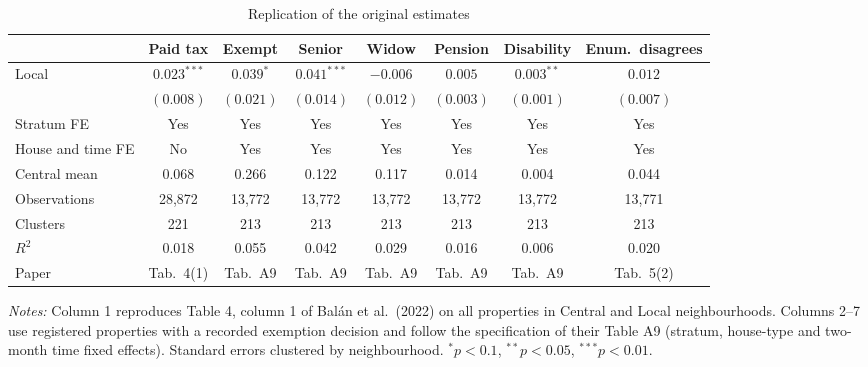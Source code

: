 \begin{table}[!htbp]\centering\footnotesize
\caption{Replication of the original estimates}\label{tab:replication}
\begin{threeparttable}
\begin{tabular}{lccccccc}
\toprule
 & Paid tax & Exempt & Senior & Widow & Pension & Disability & Enum.\ disagrees \\
\midrule
Local & $0.023^{***}$ & $0.039^{*}$ & $0.041^{***}$ & $-0.006$ & $0.005$ & $0.003^{**}$ & $0.012$ \\
 & $(0.008)$ & $(0.021)$ & $(0.014)$ & $(0.012)$ & $(0.003)$ & $(0.001)$ & $(0.007)$ \\
\midrule
Stratum FE & Yes & Yes & Yes & Yes & Yes & Yes & Yes \\
House and time FE & No & Yes & Yes & Yes & Yes & Yes & Yes \\
Central mean & 0.068 & 0.266 & 0.122 & 0.117 & 0.014 & 0.004 & 0.044 \\
Observations & 28,872 & 13,772 & 13,772 & 13,772 & 13,772 & 13,772 & 13,771 \\
Clusters & 221 & 213 & 213 & 213 & 213 & 213 & 213 \\
$R^2$ & 0.018 & 0.055 & 0.042 & 0.029 & 0.016 & 0.006 & 0.020 \\
Paper & Tab.\ 4(1) & Tab.\ A9 & Tab.\ A9 & Tab.\ A9 & Tab.\ A9 & Tab.\ A9 & Tab.\ 5(2) \\
\bottomrule
\end{tabular}
\begin{tablenotes}[flushleft]\scriptsize
\item \textit{Notes:} Column 1 reproduces Table 4, column 1 of Bal\'an et al.\ (2022) on all properties in Central and Local neighbourhoods. Columns 2--7 use registered properties with a recorded exemption decision and follow the specification of their Table A9 (stratum, house-type and two-month time fixed effects). Standard errors clustered by neighbourhood. $^{*}p<0.1$, $^{**}p<0.05$, $^{***}p<0.01$.
\end{tablenotes}
\end{threeparttable}
\end{table}